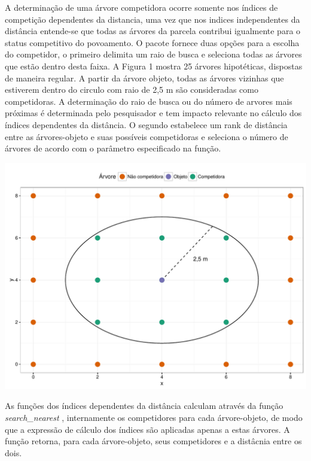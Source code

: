 \documentclass[article]{jss}
\begin{document}
A determinação de uma árvore competidora ocorre somente nos índices de
competição dependentes da distancia, uma vez que nos indices
independentes da distância entende-se que todas as árvores da parcela
contribui igualmente para o status competitivo do povoamento. O pacote
fornece duas opções para a escolha do competidor, o primeiro delimita um
raio de busca e seleciona todas as árvores que estão dentro desta faixa.
A Figura 1 mostra 25 árvores hipotéticas, dispostas de maneira regular.
A partir da árvore objeto, todas as árvores vizinhas que estiverem
dentro do circulo com raio de 2,5 m são consideradas como competidoras.
A determinação do raio de busca ou do número de arvores mais próximas é
determinada pelo pesquisador e tem impacto relevante no cálculo dos
índices dependentes da distância. O segundo estabelece um rank de
distância entre as árvores-objeto e suas possíveis competidoras e
seleciona o número de árvores de acordo com o parâmetro especificado na
função.

\begin{CodeChunk}


\begin{center}\includegraphics{comp3-paper_files/figure-latex/unnamed-chunk-4-1} \end{center}

\end{CodeChunk}

As funções dos índices dependentes da distância calculam através da
função \emph{search\_nearest} , internamente os competidores para cada
árvore-objeto, de modo que a expressão de cálculo dos índices são
aplicadas apenas a estas árvores. A função retorna, para cada
árvore-objeto, seus competidores e a distâcnia entre os dois.
\end{document}
